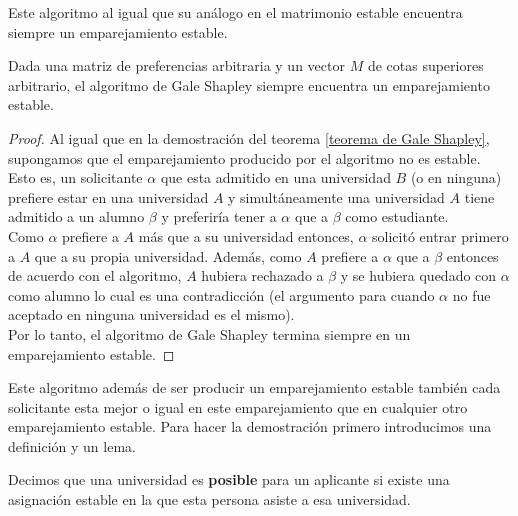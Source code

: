 Este algoritmo al igual que su análogo en el matrimonio estable encuentra siempre un emparejamiento estable.
\begin{cor}
\label{gsu}
Dada una matriz de preferencias arbitraria y un vector $M$ de cotas superiores arbitrario, el algoritmo de Gale Shapley siempre encuentra un emparejamiento estable.
\end{cor}
\begin{proof}
Al igual que en la demostración del teorema \ref{teorema de Gale Shapley}, supongamos que el emparejamiento producido por el algoritmo no es estable. 
Esto es, un solicitante $\alpha$ que esta admitido en una universidad $B$ (o en ninguna) prefiere estar en una universidad $A$ y simultáneamente una universidad $A$ tiene admitido a un alumno $\beta$ y preferiría tener a $\alpha$ que a $\beta$ como estudiante. \\
Como $\alpha$ prefiere a $A$ más que a su universidad entonces, $\alpha$ solicitó entrar primero a $A$ que a su propia universidad. 
Además, como $A$ prefiere a $\alpha$ que a $\beta$ entonces de acuerdo con el algoritmo, $A$ hubiera rechazado a $\beta$ y se hubiera quedado con $\alpha$ como alumno lo cual es una contradicción (el argumento para cuando $\alpha$ no fue aceptado en ninguna universidad es el mismo). \\
Por lo tanto, el algoritmo de Gale Shapley termina siempre en un emparejamiento estable. 
\end{proof}

Este algoritmo además de ser producir un emparejamiento estable también cada solicitante esta mejor o igual en este emparejamiento que en cualquier otro emparejamiento estable. Para hacer la demostración primero introducimos una definición y un lema. 

\begin{dfn}{\cite{GaleShapley}}
\label{Posible}
Decimos que una universidad es \textbf{posible} para un aplicante si existe una asignación estable en la que esta persona asiste a esa universidad.
\end{dfn}

